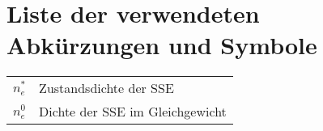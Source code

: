 \chapter{Liste der verwendeten Abkürzungen und Symbole}

\begin{tabular}{rp{}}
$n_e^*$ & Zustandsdichte der SSE\\
$n_e^0$ & Dichte der SSE im Gleichgewicht\\
\end{tabular}

